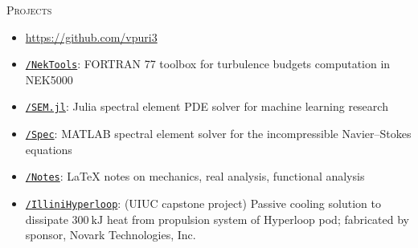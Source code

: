 \documentclass[10pt]{article}
\begin{document}
\begin{multicols}{2}
\textsc{Projects}
\columnbreak

\vspace{-1.75em}
\begin{itemize}[label=-]
    \setlength{\itemindent}{-1.50em}
    \setlength\itemsep{-0.25em}
    \item[]\hspace{-1.00em}\url{https://github.com/vpuri3}
    \item \href{https://github.com/vpuri3/NekTools}{\texttt{/NekTools}}: FORTRAN 77 toolbox for turbulence budgets computation in NEK5000
    \item \href{https://github.com/vpuri3/SEM.jl}{\texttt{/SEM.jl}}: Julia spectral element PDE solver for machine learning research
    \item \href{https://github.com/vpuri3/Spec}{\texttt{/Spec}}: MATLAB spectral element solver for the incompressible Navier--Stokes equations
    \item \href{https://github.com/vpuri3/Notes}{\texttt{/Notes}}: \LaTeX{} notes on mechanics, real analysis, functional analysis
    \item \href{https://github.com/vpuri3/IlliniHyperloop}{\texttt{/IlliniHyperloop}}: (UIUC capstone project) Passive cooling solution to dissipate $\SI{300}{\kilo \joule}$ heat from propulsion system of Hyperloop pod; fabricated by sponsor, Novark Technologies, Inc.
\end{itemize}
\vspace{-2.0em}

\end{multicols}
\vspace{-1.5em}
\vfill
\end{document}
